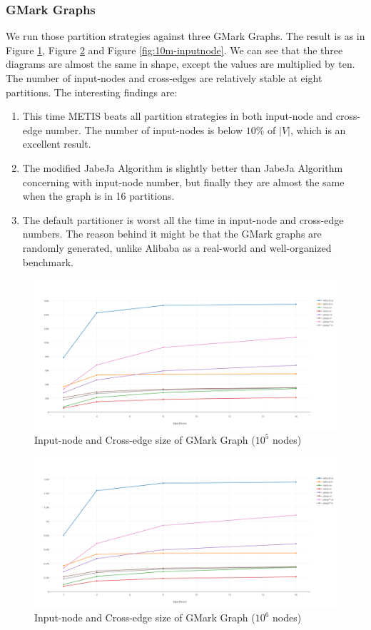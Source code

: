 \subsubsection{GMark Graphs}
We run those partition strategies against three GMark Graphs. The result is as in Figure \ref{fig:0.1m-inputnode}, Figure \ref{fig:1m-inputnode} and Figure \ref{fig:10m-inputnode}. We can see that the three diagrams are almost the same in shape, except the values are multiplied by ten. The number of input-nodes and cross-edges are relatively stable at eight partitions. The interesting findings are:
\begin{enumerate}
    \item This time METIS beats all partition strategies in both input-node and cross-edge number. The number of input-nodes is below $10\%$ of $|V|$, which is an excellent result.
    \item The modified JabeJa Algorithm is slightly better than JabeJa Algorithm concerning with input-node number, but finally they are almost the same when the graph is in 16 partitions.
    \item The default partitioner is worst all the time in input-node and cross-edge numbers. The reason behind it might be that the GMark graphs are randomly generated, unlike Alibaba as a real-world and well-organized benchmark.
\end{enumerate}
\begin{figure}[h!]
  \caption{Input-node and Cross-edge size of GMark Graph ($10^5$ nodes)}
  \label{fig:0.1m-inputnode}
  \centering
    \includegraphics[width=1.0\textwidth]{img/-1m-inputnode}
\end{figure}
\begin{figure}[h!]
  \caption{Input-node and Cross-edge size of GMark Graph ($10^6$ nodes)}
  \label{fig:1m-inputnode}
  \centering
    \includegraphics[width=1.0\textwidth]{img/1m-inputnode}
\end{figure}
